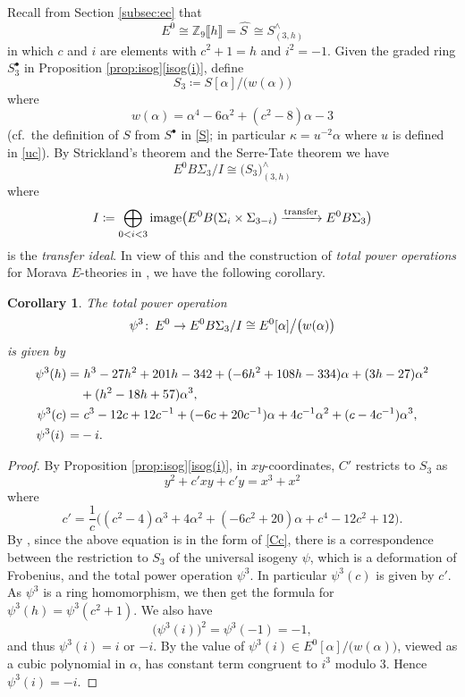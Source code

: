 \documentclass{gtpart}
\newtheorem{cor}[thm]{Corollary}
\theoremstyle{definition}
\theoremstyle{remark}
\def\co{\colon\thinspace}
\newcommand{\mb}[1]{\mathbb{#1}}
\newcommand{\BZ}{{\mb Z}}
\newcommand{\HS}{\widehat{S~}\!}
\newcommand{\A}{\alpha}
\newcommand{\K}{\kappa}
\newcommand{\p}{\psi^3}
\newcommand{\s}{S^\bullet}
\newcommand{\isog}[1]{Proposition \ref{prop:isog}\thinspace \eqref{isog(#1)}}
\begin{document}
Recall from Section \ref{subsec:ec} that 
\[
 E^0 \cong \BZ_9 \llbracket h \rrbracket = \HS \cong S_{(3,h)}^\wedge 
\]
in which $c$ and $i$ are elements with $c^2 + 1 = h$ and $i^2 = -1$.  
Given the graded ring $\s_3$ in \isog{i}, define 
\begin{equation}
\label{S_3}
 S_3 \coloneqq S [\A] \big/ \big( w(\A) \big) 
\end{equation}
where 
\[
 w(\A) = \A^4 - 6 \A^2 + (c^2 - 8) \A - 3 
\]
(cf.~the definition of $S$ from $\s$ in \eqref{S}; in particular 
$\K = u^{-2} \A$ where $u$ is defined in \eqref{uc}).  By Strickland's 
theorem \cite[Theorem 1.1]{Str98} and the Serre-Tate theorem 
\cite[2.9.1]{KM} we have 
\[
 E^0 B\Sigma_3 / I \cong \big( S_3 \big)_{(3,h)}^\wedge 
\]
where 
\begin{equation}
\label{transfer}
 I \coloneqq \bigoplus_{0<i<3} {\rm image} \big( E^0 B(\Sigma_i \times \Sigma_{3-i}) \xrightarrow{\rm transfer} E^0 B\Sigma_3 \big) 
\end{equation}
is the {\em transfer ideal}.  
In view of this and the construction of {\em total power operations} for 
Morava $E$-theories in \cite[3.23]{cong}, we have the following 
corollary.  
\begin{cor}
\label{cor:psi3}
 The total power operation 
 \[
  \p \co E^0 \to E^0 B\Sigma_3 / I \cong E^0 [\A] \big/ \big( w(\A) \big) 
 \]
 is given by 
 \begin{equation*}
 \begin{split}
  \p(h) = & ~ h^3 - 27 h^2 + 201 h -342 + (-6 h^2 + 108 h - 334) \A + (3 h - 27) \A^2 \\
          & + (h^2 - 18 h + 57) \A^3, \\
  \p(c) = & ~ c^3 -12 c + 12 c^{-1} + (-6 c + 20 c^{-1}) \A + 4 c^{-1} \A^2 + (c - 4 c^{-1}) \A^3, \\
  \p(i) \thinspace = & -i.  
 \end{split}
 \end{equation*}
\end{cor}
\begin{proof}
 By \isog{i}, in $xy$-coordinates, $C'$ restricts to $S_3$ as 
 \[
  y^2 + c' x y + c' y = x^3 + x^2 
 \]
 where 
 \[
  c' = \frac{1}{c} \big( (c^2 - 4) \A^3 + 4 \A^2 + (-6 c^2 + 20) \A + c^4 - 12 c^2 + 12 \big).  
 \]
 By \cite[Theorem B]{cong}, since the above equation is in the form of 
 \eqref{Cc}, there is a correspondence between the restriction to $S_3$ 
 of the universal isogeny $\psi$, which is a deformation of Frobenius, 
 and the total power operation $\p$.  In particular $\p(c)$ is given by 
 $c'$.  As $\p$ is a ring homomorphism, we then get the formula for 
 $\p(h) = \p(c^2 + 1)$.  We also have 
 \[
  \big( \p(i) \big)^2 = \p(-1) = -1, 
 \]
 and thus $\p(i) = i$ or $-i$.  By 
 \cite[Propositions 3.25 and 10.5]{cong} the value of 
 $\p(i) \in E^0 [\A] \big/ \big( w(\A) \big)$, viewed as a cubic 
 polynomial in $\A$, has constant term congruent to $i^3$ modulo 3.  
 Hence $\p(i) = -i$.  
\end{proof}
\end{document}
